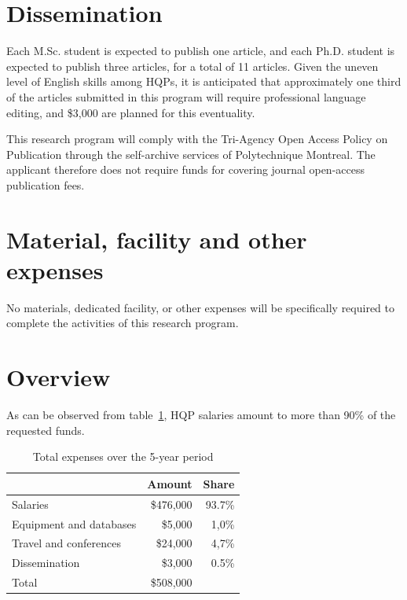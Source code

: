 \documentclass{nserc} %
\begin{document}
\section{Dissemination}

Each M.Sc. student is expected to publish one article, and each Ph.D. student is expected to publish three articles, for a total of 11 articles. Given the uneven level of English skills among HQPs, it is anticipated that approximately one third of the articles submitted in this program will require professional language editing, and \$3,000 are planned for this eventuality.

This research program will comply with the Tri-Agency Open Access Policy on Publication through the self-archive services of Polytechnique Montreal. The applicant therefore does not require funds for covering journal open-access publication fees.


\section{Material, facility and other expenses}

No materials, dedicated facility, or other expenses will be specifically required to complete the activities of this research program.


\section{Overview}

As can be observed from table~\ref{tab_overview}, HQP salaries amount to more than 90\% of the requested funds.


\begin{table}[H]
	\centering
	\caption{Total expenses over the 5-year period}
	\begin{tabular}{lrr}
		\toprule
		&Amount&Share\\
		\midrule
		Salaries&\$476,000&93.7\%\\
		Equipment and databases&\$5,000&1,0\%\\
		Travel and conferences&\$24,000&4,7\%\\
		Dissemination&\$3,000&0.5\%\\
		\midrule
		Total&\$508,000&\\
		\bottomrule
	\end{tabular}
	\label{tab_overview}
\end{table}
\end{document}
